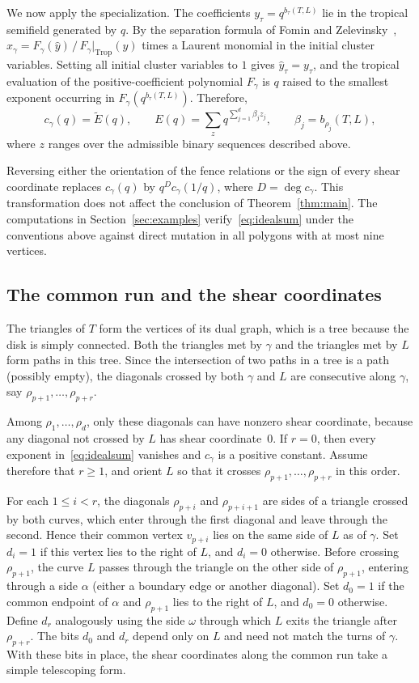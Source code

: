 \documentclass[11pt]{amsart}
\theoremstyle{remark}
\numberwithin{equation}{section}
\begin{document}
We now apply the specialization. The coefficients $y_\tau=q^{b_\tau(T,L)}$ lie
in the tropical semifield generated by $q$. By the separation formula of Fomin
and Zelevinsky~\cite[Theorem~3.7]{FZ},
$x_\gamma=F_\gamma(\hat y)\,/\,F_\gamma|_{\mathrm{Trop}}(y)$ times a Laurent
monomial in the initial cluster variables. Setting all initial cluster
variables to $1$ gives $\hat y_\tau=y_\tau$, and the tropical evaluation of the
positive-coefficient polynomial $F_\gamma$ is $q$ raised to the smallest
exponent occurring in $F_\gamma(q^{b_\tau(T,L)})$. Therefore,
\begin{equation}\label{eq:idealsum}
c_\gamma(q)=\widetilde{E}(q),\qquad
E(q)=\sum_{z}q^{\sum_{j=1}^d\beta_jz_j},\qquad \beta_j=b_{\rho_j}(T,L),
\end{equation}
where $z$ ranges over the admissible binary sequences described above.

Reversing either the orientation of the fence relations or the sign of every
shear coordinate replaces $c_\gamma(q)$ by $q^{D}c_\gamma(1/q)$, where
$D=\deg c_\gamma$. This transformation does not affect the conclusion of
Theorem~\ref{thm:main}. The computations in Section~\ref{sec:examples}
verify~\eqref{eq:idealsum} under the conventions above against direct mutation
in all polygons with at most nine vertices.

\subsection{The common run and the shear coordinates}
The triangles of $T$ form the vertices of its dual graph, which is a tree
because the disk is simply connected. Both the triangles met by $\gamma$ and
the triangles met by $L$ form paths in this tree. Since the intersection of two
paths in a tree is a path (possibly empty), the diagonals crossed by both
$\gamma$ and $L$ are consecutive along $\gamma$, say
$\rho_{p+1},\dots,\rho_{p+r}$.

Among $\rho_1,\dots,\rho_d$, only these diagonals can have nonzero shear
coordinate, because any diagonal not crossed by $L$ has shear coordinate~$0$.
If $r=0$, then every exponent in~\eqref{eq:idealsum} vanishes and $c_\gamma$ is
a positive constant. Assume therefore that $r\ge1$, and orient $L$ so that it
crosses $\rho_{p+1},\dots,\rho_{p+r}$ in this order.

For each $1\le i<r$, the diagonals $\rho_{p+i}$ and $\rho_{p+i+1}$ are sides of
a triangle crossed by both curves, which enter through the first diagonal and
leave through the second. Hence their common vertex $v_{p+i}$ lies on the same
side of $L$ as of $\gamma$. Set $d_i=1$ if this vertex lies to the right of
$L$, and $d_i=0$ otherwise. Before crossing $\rho_{p+1}$, the curve $L$ passes
through the triangle on the other side of $\rho_{p+1}$, entering through a side
$\alpha$ (either a boundary edge or another diagonal). Set $d_0=1$ if the
common endpoint of $\alpha$ and $\rho_{p+1}$ lies to the right of $L$, and
$d_0=0$ otherwise. Define $d_r$ analogously using the side $\omega$ through
which $L$ exits the triangle after $\rho_{p+r}$. The bits $d_0$ and $d_r$
depend only on $L$ and need not match the turns of $\gamma$. With these bits in
place, the shear coordinates along the common run take a simple telescoping
form.
\end{document}
